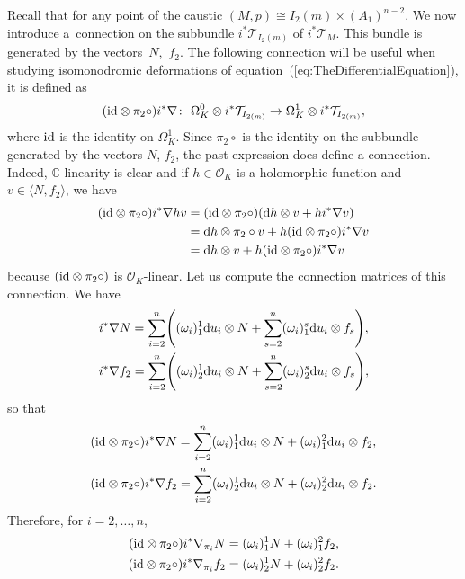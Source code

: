 \documentclass[pdftex]{sigma}
\numberwithin{equation}{section}
\begin{document}
 Recall that for any point of the caustic $(M,p)\cong I_{2}(m)\times(A_{1})^{n-2}$. We now introduce a~connection on the subbundle $i^{*}\mathcal{T}_{I_{2}(m)}$ of $i^{*}\mathcal{T}_{M}$. This bundle is generated by the vectors~$N$,~$f_{2}$. The following connection will be useful when studying isomonodromic deformations of equation~(\ref{eq:TheDifferentialEquation}), it is defined as
 \begin{equation*}
 ({\rm id}\otimes\pi_{2}\circ)i^{*}\nabla\colon \ \Omega^{0}_{K}\otimes i^{*}\mathcal{T}_{I_{2(m)}}\rightarrow\Omega^{1}_{K}\otimes i^{*}\mathcal{T}_{I_{2(m)}},
 \end{equation*}
 where ${\rm id}$ is the identity on $\Omega^{1}_{K}$. Since $\pi_{2}\circ$ is the identity on the subbundle generated by the vectors $N$, $f_{2}$, the past expression does define a connection. Indeed, $\mathbb{C}$-linearity is clear and if $h\in\mathcal{O}_{K}$ is a holomorphic function and $v\in \langle N,f_{2}\rangle$, we have
 \begin{align*}
 ({\rm id}\otimes\pi_{2}\circ)i^{*}\nabla hv& =({\rm id}\otimes\pi_{2}\circ)({\rm d}h\otimes v+hi^{*}\nabla v)\\
 & ={\rm d}h\otimes\pi_{2}\circ v+h({\rm id}\otimes\pi_{2}\circ)i^{*}\nabla v\\
 & ={\rm d}h\otimes v+h({\rm id}\otimes\pi_{2}\circ)i^{*}\nabla v
 \end{align*}
 because $({\rm id}\otimes\pi_{2}\circ)$ is $\mathcal{O}_{K}$-linear. Let us compute the connection matrices of this connection. We have
 \begin{align*}
 & i^{*}\nabla N=\sum_{i=2}^{n}\Biggl((\omega_{i})_{1}^{1}{\rm d}u_{i}\otimes N+\sum_{s=2}^{n}(\omega_{i})^{s}_{1}{\rm d}u_{i}\otimes f_{s}\Biggr),\\
 & i^{*}\nabla f_{2}=\sum_{i=2}^{n}\Biggl((\omega_{i})_{2}^{1}{\rm d}u_{i}\otimes N+\sum_{s=2}^{n}(\omega_{i})^{s}_{2}{\rm d}u_{i}\otimes f_{s}\Biggr),
 \end{align*}
 so that
 \begin{align*}
 & ({\rm id}\otimes\pi_{2}\circ)i^{*}\nabla N=\sum_{i=2}^{n}(\omega_{i})^{1}_{1}{\rm d}u_{i}\otimes N+(\omega_{i})^{2}_{1}{\rm d}u_{i}\otimes f_{2},\\
 & ({\rm id}\otimes\pi_{2}\circ)i^{*}\nabla f_{2}=\sum_{i=2}^{n}(\omega_{i})^{1}_{2}{\rm d}u_{i}\otimes N+(\omega_{i})^{2}_{2}{\rm d}u_{i}\otimes f_{2}.
 \end{align*}
 Therefore, for $i=2,\dots,n$,
 \begin{equation*}
 \begin{aligned}
 ({\rm id}\otimes\pi_{2}\circ)i^{*}\nabla_{\pi_{i}}N&=(\omega_{i})^{1}_{1}N+(\omega_{i})^{2}_{1}f_{2},\\
 ({\rm id}\otimes\pi_{2}\circ)i^{*}\nabla_{\pi_{i}}f_{2}&=(\omega_{i})^{1}_{2}N+(\omega_{i})^{2}_{2}f_{2}.
 \end{aligned}
 \end{equation*}
\end{document}
